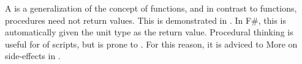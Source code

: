 \documentclass[fsharpnotes.tex]{subfiles}
\begin{document}
A  is a generalization of the concept of functions, and in contrast to functions, procedures need not return values. This is demonstrated in .
%
%
In F\#, this is automatically given the unit type as the return value. Procedural thinking is useful for  of scripts, but is prone to . 
For this reason, it is adviced to   More on side-effects in .
\end{document}
